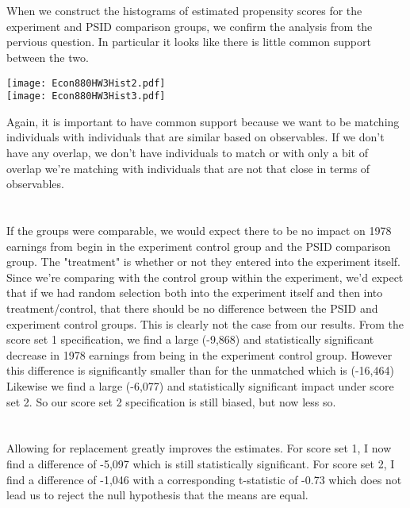 \documentclass[11pt]{article}
\theoremstyle{definition}
\begin{document}
\section{}
When we construct the histograms of estimated propensity scores for the experiment and PSID comparison groups, we confirm the analysis from the pervious question.  In particular it looks like there is little common support between the two.  

\begin{center}
\texttt{[image: Econ880HW3Hist2.pdf]} \\

\texttt{[image: Econ880HW3Hist3.pdf]}
\end{center}

Again, it is important to have common support because we want to be matching individuals with individuals that are similar based on observables.  If we don't have any overlap, we don't have individuals to match or with only a bit of overlap we're matching with individuals that are not that close in terms of observables.   

\section{}
If the groups were comparable, we would expect there to be no impact on 1978 earnings from begin in the experiment control group and the PSID comparison group.  The "treatment" is whether or not they entered into the experiment itself.  Since we're comparing with the control group within the experiment, we'd expect that if we had random selection both into the experiment itself and then into treatment/control, that there should be no difference between the PSID and experiment control groups.  This is clearly not the case from our results.  From the score set 1 specification, we find a large (-9,868) and statistically significant decrease in 1978 earnings from being in the experiment control group.  However this difference is significantly smaller than for the unmatched which is (-16,464)  Likewise we find a large (-6,077) and statistically significant impact under score set 2.  So our score set 2 specification is still biased, but now less so.  

\section{}
Allowing for replacement greatly improves the estimates.  For score set 1, I now find a difference of -5,097 which is still statistically significant.  For score set 2, I find a difference of -1,046 with a corresponding t-statistic of -0.73 which does not lead us to reject the null hypothesis that the means are equal.
\end{document}
